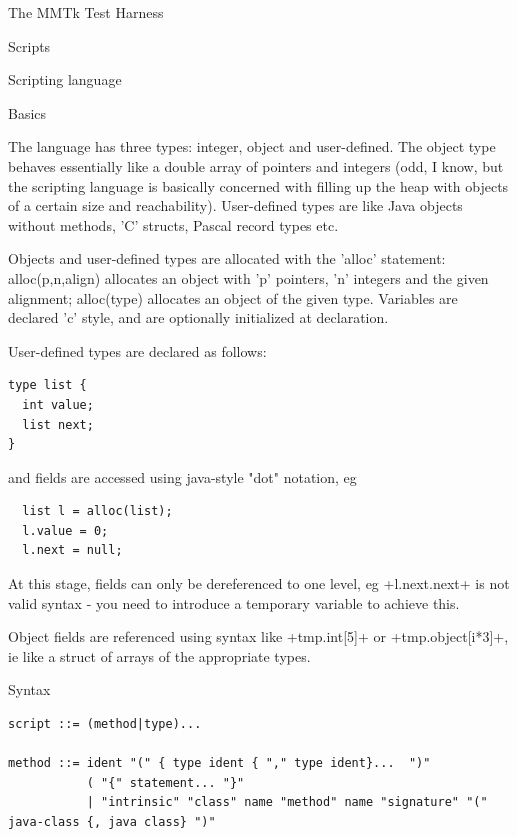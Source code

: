 \begin{chapter}{The MMTk Test Harness}
\begin{section}{Scripts}
\end{section}

\begin{section}{Scripting language}

\begin{subsection}{Basics}

The language has three types: integer, object and user-defined. The object type behaves essentially like a double array of pointers and integers (odd, I know, but the scripting language is basically concerned with filling up the heap with objects of a certain size and reachability).  User-defined types are like Java objects without methods, 'C' structs, Pascal record types etc.

Objects and user-defined types are allocated with the 'alloc' statement: alloc(p,n,align) allocates an object with 'p' pointers, 'n' integers and the given alignment; alloc(type) allocates an object of the given type.  Variables are declared 'c' style, and are optionally initialized at declaration.

User-defined types are declared as follows:

\begin{lstlisting}
type list {
  int value;
  list next;
}
\end{lstlisting}

and fields are accessed using java-style "dot" notation, eg
\begin{lstlisting}
  list l = alloc(list);
  l.value = 0;
  l.next = null;
\end{lstlisting}

At this stage, fields can only be dereferenced to one level, eg \spverb+l.next.next+ is not valid syntax - you need to introduce a temporary variable to achieve this.

Object fields are referenced using syntax like \spverb+tmp.int[5]+ or \spverb+tmp.object[i*3]+,
ie like a struct of arrays of the appropriate types.

\end{subsection}

\begin{subsection}{Syntax}

\begin{lstlisting}
script ::= (method|type)...

method ::= ident "(" { type ident { "," type ident}...  ")"
           ( "{" statement... "}"
           | "intrinsic" "class" name "method" name "signature" "(" java-class {, java class} ")"


\end{lstlisting}
\end{subsection}
\end{section}
\end{chapter}
